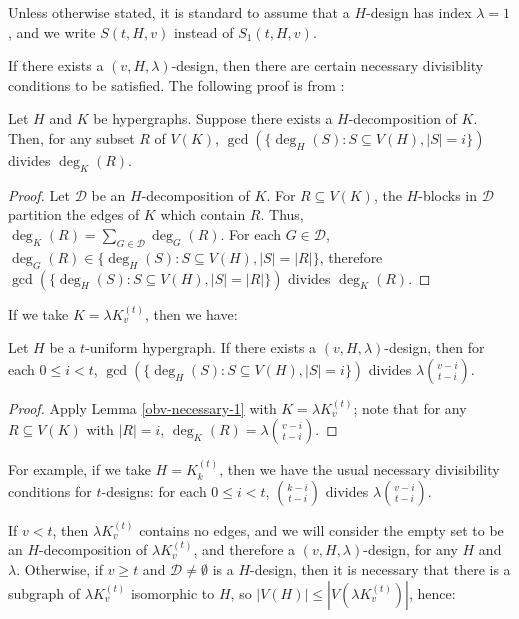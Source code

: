 Unless otherwise stated, it is standard to assume that a $H$-design has index $\lambda = 1$, and we write $S(t, H, v)$ instead of $S_1(t, H, v)$.

If there exists a $(v, H, \lambda)$-design, then there are certain necessary divisiblity conditions to be satisfied.
The following proof is from \cite{bryant}:

\begin{lemma} \label{obv-necessary-1}
Let $H$ and $K$ be hypergraphs.
Suppose there exists a $H$-decomposition of $K$. Then, for any subset $R$ of $V(K)$,
  $\gcd(\{\deg_H(S) : S \subseteq V(H), |S| = i\})$ divides $\deg_K(R)$.
\end{lemma}

\begin{proof}
Let $\mathcal{D}$ be an $H$-decomposition of $K$.
For $R \subseteq V(K)$, the $H$-blocks in $\mathcal{D}$ partition the edges of $K$ which contain $R$.
Thus, $\deg_K(R) = \sum_{G \in \mathcal{D}} \deg_G(R)$.
For each $G \in \mathcal{D}$, $\deg_G(R) \in \{\deg_H(S) : S \subseteq V(H), |S| = |R|\}$,
  therefore $\gcd(\{\deg_H(S) : S \subseteq V(H), |S| = |R|\})$ divides $\deg_K(R)$.
\end{proof}

If we take $K = \lambda K_v^{(t)}$, then we have:

\begin{lemma} \label{obv-necessary}
Let $H$ be a $t$-uniform hypergraph.
If there exists a $(v, H, \lambda)$-design, then for each $0 \leq i < t$,
  $\gcd(\{ \deg_H(S) : S \subseteq V(H), |S| = i \})$ divides $\lambda {v-i \choose t-i}$.
\end{lemma}

\begin{proof}
Apply Lemma \ref{obv-necessary-1} with $K = \lambda K_v^{(t)}$;
  note that for any $R \subseteq V(K)$ with $|R| = i$, $\deg_K(R) = \lambda {v-i \choose t-i}$.
\end{proof}

For example, if we take $H = K_k^{(t)}$, then we have the usual necessary divisibility conditions for $t$-designs: for each $0 \leq i < t$, ${k-i \choose t-i}$ divides $\lambda {v-i \choose t-i}$.

If $v < t$, then $\lambda K_v^{(t)}$ contains no edges, and we will consider the empty set to be an $H$-decomposition of $\lambda K_v^{(t)}$, and therefore a $(v, H, \lambda)$-design, for any $H$ and $\lambda$. Otherwise, if $v \geq t$ and $\mathcal{D} \neq \emptyset$ is a $H$-design, then it is necessary that there is a subgraph of $\lambda K_v^{(t)}$ isomorphic to $H$, so $|V(H)| \leq |V(\lambda K_v^{(t)})|$, hence:

